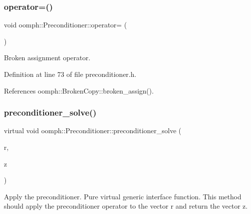 \subsubsection{\texorpdfstring{operator=()}{operator=()}}
{\footnotesize\ttfamily void oomph\+::\+Preconditioner\+::operator= (\begin{DoxyParamCaption}\item[{const \hyperlink{classoomph_1_1Preconditioner}{Preconditioner} \&}]{ }\end{DoxyParamCaption})\hspace{0.3cm}{\ttfamily [inline]}}



Broken assignment operator. 



Definition at line 73 of file preconditioner.\+h.



References oomph\+::\+Broken\+Copy\+::broken\+\_\+assign().

\mbox{\label{classoomph_1_1Preconditioner_ace1199369e4465cd2b9a34884bb64ec8}} 
\subsubsection{\texorpdfstring{preconditioner\+\_\+solve()}{preconditioner\_solve()}}
{\footnotesize\ttfamily virtual void oomph\+::\+Preconditioner\+::preconditioner\+\_\+solve (\begin{DoxyParamCaption}\item[{const \hyperlink{classoomph_1_1DoubleVector}{Double\+Vector} \&}]{r,  }\item[{\hyperlink{classoomph_1_1DoubleVector}{Double\+Vector} \&}]{z }\end{DoxyParamCaption})\hspace{0.3cm}{\ttfamily [pure virtual]}}



Apply the preconditioner. Pure virtual generic interface function. This method should apply the preconditioner operator to the vector r and return the vector z. 



